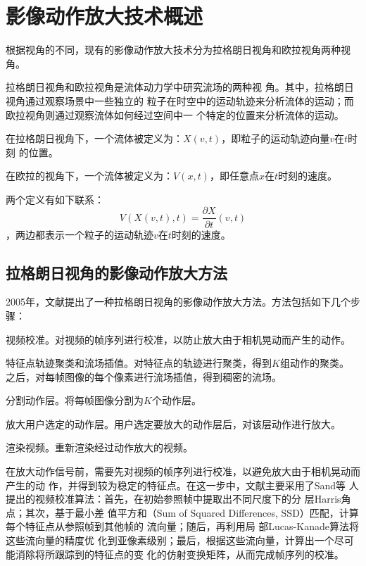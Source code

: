 \chapter{影像动作放大技术概述}
\label{chap:previous}

根据视角的不同，现有的影像动作放大技术分为拉格朗日视角和欧拉视角两种视角。

拉格朗日视角和欧拉视角是流体动力学中研究流场的两种视
角。其中，拉格朗日视角通过观察场景中一些独立的
粒子在时空中的运动轨迹来分析流体的运动；而欧拉视角则通过观察流体如何经过空间中一
个特定的位置来分析流体的运动。

\begin{definition}[拉格朗日视角的流体]
  在拉格朗日视角下，一个流体被定义为：$X(v,t)$，即粒子的运动轨迹向量$v$在$t$时刻
  的位置。
\end{definition}

\begin{definition}[欧拉视角的流体]
  在欧拉的视角下，一个流体被定义为：$V(x,t)$，即任意点$x$在$t$时刻的速度。
\end{definition}

两个定义有如下联系：
$$V(X(v,t),t)=\frac{\partial X}{\partial t}(v, t)$$，两边都表示一个粒子的运动轨迹$v$在$t$时刻的速度。

\section{拉格朗日视角的影像动作放大方法}
\label{sec:lagriangian}

2005年，文献\cite{liu2005motion}提出了一种拉格朗日视角的影像动作放大方法。方法包括如下几个步骤：

\begin{compactenum}
\item 视频校准。对视频的帧序列进行校准，以防止放大由于相机晃动而产生的动作。
\item 特征点轨迹聚类和流场插值。对特征点的轨迹进行聚类，得到$K$组动作的聚类。
  之后，对每帧图像的每个像素进行流场插值，得到稠密的流场。
\item 分割动作层。将每帧图像分割为$K$个动作层。
\item 放大用户选定的动作层。用户选定要放大的动作层后，对该层动作进行放大。
\item 渲染视频。重新渲染经过动作放大的视频。
\end{compactenum}

在放大动作信号前，需要先对视频的帧序列进行校准，以避免放大由于相机晃动而产生的动
作，并得到较为稳定的特征点。在这一步中，文献\cite{liu2005motion}主要采用了Sand等
人提出的视频校准算法：首先，在初始参照帧中提取出不同尺度下的分
层Harris角点；其次，基于最小差
值平方和（Sum of Squared Differences, SSD）匹配，计算每个特征点从参照帧到其他帧的
流向量；随后，再利用局
部Lucas-Kanade算法将这些流向量的精度优
化到亚像素级别；最后，根据这些流向量，计算出一个尽可能消除将所跟踪到的特征点的变
化的仿射变换矩阵，从而完成帧序列的校准。

